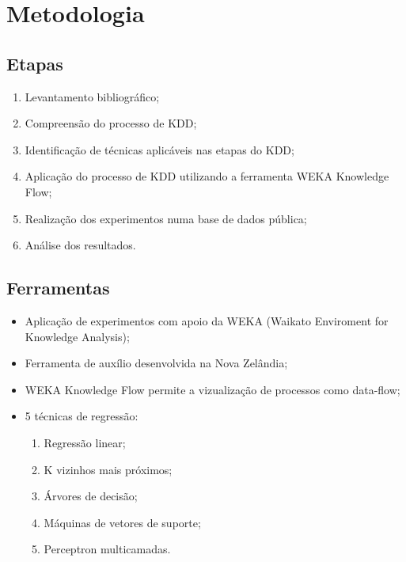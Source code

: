 \section{Metodologia}

\subsection{Etapas}
\begin{frame}
	\begin{enumerate}
		\item Levantamento bibliográfico;
		\item Compreensão do processo de KDD;
		\item Identificação de técnicas aplicáveis nas etapas do KDD;
		\item Aplicação do processo de KDD utilizando a ferramenta WEKA Knowledge Flow;
		\item Realização dos experimentos numa base de dados pública;
		\item Análise dos resultados.
	\end{enumerate}
\end{frame}

\subsection{Ferramentas}
\begin{frame}
	\begin{itemize}
		\item Aplicação de experimentos com apoio da WEKA (Waikato Enviroment for Knowledge Analysis);
		\item Ferramenta de auxílio desenvolvida na Nova Zelândia;
		\item WEKA Knowledge Flow permite a vizualização de processos como data-flow;
		\item 5 técnicas de regressão:
		\begin{enumerate}
			\item Regressão linear;
			\item K vizinhos mais próximos;
			\item Árvores de decisão;
			\item Máquinas de vetores de suporte;
			\item Perceptron multicamadas.
		\end{enumerate}
	\end{itemize}
\end{frame}

